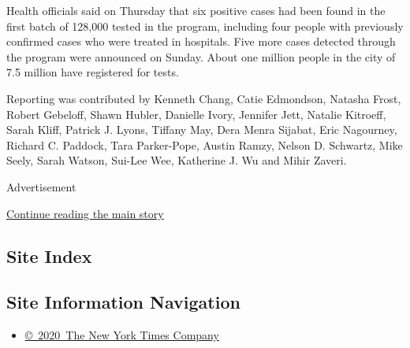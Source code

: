 Health officials said on Thursday that six positive cases had been found
in the first batch of 128,000 tested in the program, including four
people with previously confirmed cases who were treated in hospitals.
Five more cases detected through the program were announced on Sunday.
About one million people in the city of 7.5 million have registered for
tests.

Reporting was contributed by Kenneth Chang, Catie Edmondson, Natasha
Frost, Robert Gebeloff, Shawn Hubler, Danielle Ivory, Jennifer Jett,
Natalie Kitroeff, Sarah Kliff, Patrick J. Lyons, Tiffany May, Dera Menra
Sijabat, Eric Nagourney, Richard C. Paddock, Tara Parker-Pope, Austin
Ramzy, Nelson D. Schwartz, Mike Seely, Sarah Watson, Sui-Lee Wee,
Katherine J. Wu and Mihir Zaveri.

Advertisement

\protect\hyperlink{after-bottom}{Continue reading the main story}

\hypertarget{site-index}{%
\subsection{Site Index}\label{site-index}}

\hypertarget{site-information-navigation}{%
\subsection{Site Information
Navigation}\label{site-information-navigation}}

\begin{itemize}
\tightlist
\item
  \href{https://help.nytimes3xbfgragh.onion/hc/en-us/articles/115014792127-Copyright-notice}{©~2020~The
  New York Times Company}
\end{itemize}

